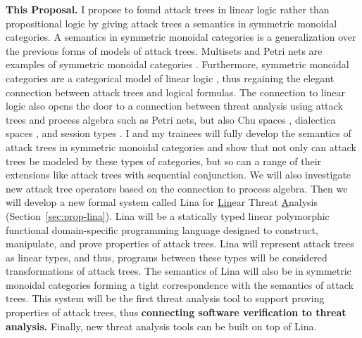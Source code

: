 \documentclass{llncs}
\begin{document}
\textbf{This Proposal.} I propose to found attack trees in linear
logic rather than propositional logic by giving attack trees a
semantics in symmetric monoidal categories.  A semantics in symmetric
monoidal categories is a generalization over the previous forms of
models of attack trees.  Multisets and Petri nets are examples of
symmetric monoidal categories \cite{Brown:1991,Tzouvaras:1998}.
Furthermore, symmetric monoidal categories are a categorical model of
linear logic \cite{dePaiva:2014}, thus regaining the elegant
connection between attack trees and logical formulas.  The connection
to linear logic also opens the door to a connection between threat
analysis using attack trees and process algebra such as Petri nets,
but also Chu spaces \cite{Pratt:1999}, dialectica spaces
\cite{dePaiva:2006b}, and session types
\cite{Wadler:2012,Caires:2010}.  I and my trainees will fully develop
the semantics of attack trees in symmetric monoidal categories and
show that not only can attack trees be modeled by these types of
categories, but so can a range of their extensions like attack trees
with sequential conjunction.  We will also investigate new attack tree
operators based on the connection to process algebra.  Then we will
develop a new formal system called Lina for \underline{Lin}ear Threat
\underline{A}nalysis (Section~\ref{sec:prop-lina}).  Lina will be a
statically typed linear polymorphic functional domain-specific
programming language designed to construct, manipulate, and prove
properties of attack trees.  Lina will represent attack trees as
linear types, and thus, programs between these types will be
considered transformations of attack trees.  The semantics of Lina
will also be in symmetric monoidal categories forming a tight
correspondence with the semantics of attack trees.  This system will
be the first threat analysis tool to support proving properties of
attack trees, thus \textbf{connecting software verification to threat
  analysis.}  Finally, new threat analysis tools can be built on top
of Lina.



\end{document}
